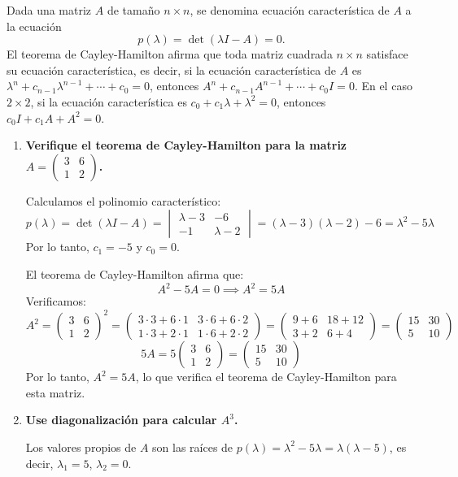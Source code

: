 \begin{prob}
Dada una matriz $A$ de tamaño $n\times n$, se denomina ecuación característica de $A$ a la ecuación
\[
p(\lambda) = \det(\lambda I - A) = 0.
\]
El teorema de Cayley-Hamilton afirma que toda matriz cuadrada $n \times n$ satisface su ecuación característica, es decir, si la ecuación característica de $A$ es $\lambda^n + c_{n-1}\lambda^{n-1} + \cdots + c_0 = 0$, entonces $A^n + c_{n-1}A^{n-1} + \cdots + c_0 I = 0$. En el caso $2 \times 2$, si la ecuación característica es $c_0 + c_1\lambda + \lambda^2 = 0$, entonces $c_0 I + c_1 A + A^2 = 0$.
\begin{enumerate}[$a)$]
\item \textbf{Verifique el teorema de Cayley-Hamilton para la matriz $A = \begin{pmatrix} 3 & 6 \\ 1 & 2 \end{pmatrix}$.}
\begin{myproof}
Calculamos el polinomio característico:
\[
p(\lambda) = \det(\lambda I - A) = 
\begin{vmatrix}
\lambda - 3 & -6 \\
-1 & \lambda - 2
\end{vmatrix}
= (\lambda - 3)(\lambda - 2) - 6 = \lambda^2 - 5\lambda
\]
Por lo tanto, $c_1 = -5$ y $c_0 = 0$.

El teorema de Cayley-Hamilton afirma que:
\[
A^2 - 5A = 0 \implies A^2 = 5A
\]
Verificamos:
\[
A^2 = \begin{pmatrix} 3 & 6 \\ 1 & 2 \end{pmatrix}^2 = \begin{pmatrix} 3\cdot3 + 6\cdot1 & 3\cdot6 + 6\cdot2 \\ 1\cdot3 + 2\cdot1 & 1\cdot6 + 2\cdot2 \end{pmatrix}
= \begin{pmatrix} 9 + 6 & 18 + 12 \\ 3 + 2 & 6 + 4 \end{pmatrix}
= \begin{pmatrix} 15 & 30 \\ 5 & 10 \end{pmatrix}
\]
\[
5A = 5\begin{pmatrix} 3 & 6 \\ 1 & 2 \end{pmatrix} = \begin{pmatrix} 15 & 30 \\ 5 & 10 \end{pmatrix}
\]
Por lo tanto, $A^2 = 5A$, lo que verifica el teorema de Cayley-Hamilton para esta matriz.
\end{myproof}
\item \textbf{Use diagonalización para calcular $A^3$.}
\begin{myproof}
Los valores propios de $A$ son las raíces de $p(\lambda) = \lambda^2 - 5\lambda = \lambda(\lambda - 5)$, es decir, $\lambda_1 = 5$, $\lambda_2 = 0$.


\end{myproof}
\end{enumerate}
\end{prob}
